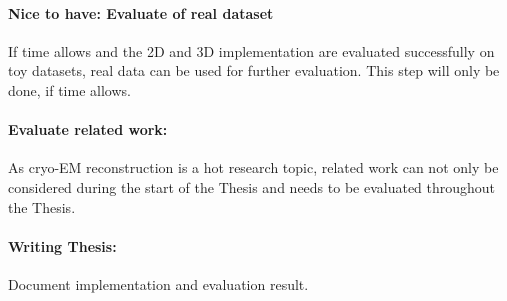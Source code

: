 \paragraph{Nice to have: Evaluate of real dataset}
If time allows and the 2D and 3D implementation are evaluated successfully on toy datasets, 
real data can be used for further evaluation. This step will only be done, if time allows.


\paragraph{Evaluate related work:}
As cryo-EM reconstruction is a hot research topic, related work can not only
be considered during the start of the Thesis and needs to be evaluated throughout the Thesis.

\paragraph{Writing Thesis:}
Document implementation and evaluation result.

